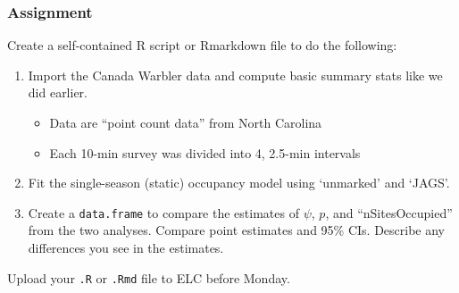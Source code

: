 \documentclass[color=usenames,dvipsnames]{beamer}\usepackage[]{graphicx}\usepackage[]{color}
\newcommand{\inr}[1]{\colorbox{inlinecolor}{\texttt{#1}}}
\begin{document}







\begin{frame}
  \frametitle{Assignment}
  \small
  Create a self-contained R script or Rmarkdown file
  to do the following:
  \begin{enumerate}
    \small
    \item Import the Canada Warbler data and compute basic summary
      stats like we did earlier.
    \begin{itemize}
      \item Data are ``point count data'' from North Carolina
      \item Each 10-min survey was divided into 4, 2.5-min intervals 
    \end{itemize}
    \item Fit the single-season (static) occupancy model using
      `unmarked' and `JAGS'. 
    \item Create a \inr{data.frame} to compare the estimates of
      $\psi$, $p$, and ``nSitesOccupied'' from the two
      analyses. Compare point estimates and 95\% CIs. Describe any
      differences you see in the estimates.
  \end{enumerate}
  Upload your {\tt .R} or {\tt .Rmd} file to ELC before Monday. 
\end{frame}
\end{document}
